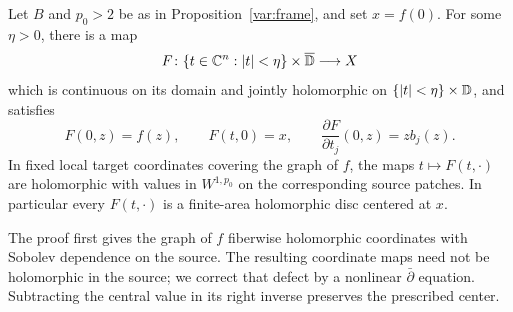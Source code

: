 \begin{proposition}\label{var:spray}
Let $B$ and $p_0>2$ be as in Proposition~\ref{var:frame}, and set
$x=f(0)$.  For some $\eta>0$, there is a map
\[
 F\colon\{t\in\mathbb C^n:|t|<\eta\}\times\overline{\mathbb D}\longrightarrow X
\]
which is continuous on its domain and jointly holomorphic on
$\{|t|<\eta\}\times\mathbb D$, and satisfies
\begin{equation}\label{var:spray-identities}
 F(0,z)=f(z),\qquad F(t,0)=x,\qquad
 \frac{\partial F}{\partial t_j}(0,z)=z b_j(z).
\end{equation}
In fixed local target coordinates covering the graph of $f$, the
maps $t\mapsto F(t,\cdot)$ are holomorphic with values in
$W^{1,p_0}$ on the corresponding source patches.  In particular
every $F(t,\cdot)$ is a finite-area holomorphic disc centered at $x$.
\end{proposition}

The proof first gives the graph of $f$ fiberwise holomorphic
coordinates with Sobolev dependence on the source. The resulting
coordinate maps need not be holomorphic in the source; we correct
that defect by a nonlinear $\bar\partial$ equation. Subtracting the
central value in its right inverse preserves the prescribed center.

